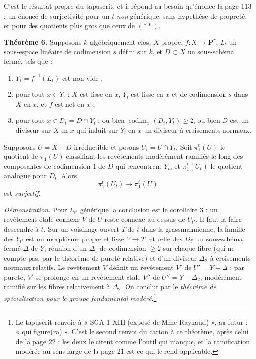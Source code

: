 \documentclass[11pt,a4paper]{article}
\begin{document}
C'est le résultat propre du tapuscrit, et il répond au besoin qu'énonce la page
113 : un énoncé de surjectivité pour un $t$ \emph{non} générique, sans
hypothèse de propreté, et pour des quotients plus gros que ceux de
$(\ast\ast)$.

\textbf{Théorème 6.} Supposons $k$ algébriquement clos, $X$ propre,
$f : X \to \mathbf{P}^{r}$, $L_{t}$ un sous-espace linéaire de codimension $s$
défini sur $k$, et $D \subset X$ un sous-schéma fermé, tels que :

\begin{enumerate}
  \item[a)] $Y_{t} = f^{-1}(L_{t})$ est non vide ;
  \item[b)] pour tout $x \in Y_{t}$ : $X$ est lisse en $x$, $Y_{t}$ est lisse
    en $x$ et de codimension $s$ dans $X$ en $x$, et $f$ est net en $x$ ;
  \item[c)] pour tout $x \in D_{t} = D \cap Y_{t}$ : ou bien
    $\operatorname{codim}_{x}(D_{t}, Y_{t}) \geqslant 2$, ou bien $D$ est un
    diviseur sur $X$ en $x$ qui induit sur $Y_{t}$ en $x$ un diviseur à
    croisements normaux.
\end{enumerate}

Supposons $U = X - D$ irréductible et posons $U_{t} = U \cap Y_{t}$. Soit
$\pi^{t}_{1}(U)$ le quotient de $\pi_{1}(U)$ classifiant les revêtements
modérément ramifiés le long des composantes de codimension 1 de $D$ qui
rencontrent $Y_{t}$, et $\pi^{t}_{1}(U_{t})$ le quotient analogue pour
$D_{t}$. Alors
\[
  \pi^{t}_{1}(U_{t}) \longrightarrow \pi^{t}_{1}(U)
\]
est \emph{surjectif}.

\emph{Démonstration.} Pour $L_{t'}$ générique la conclusion est le corollaire
3 : un revêtement étale connexe $V$ de $U$ reste connexe au-dessus de
$U_{t'}$. Il faut la faire descendre à $t$. Sur un voisinage ouvert $T$ de
$\bar{t}$ dans la grassmannienne, la famille des $Y_{t'}$ est un morphisme
propre et lisse $Y \to T$, et celle des $D_{t'}$ un sous-schéma fermé $\Delta$
de $Y$, réunion d'un $\Delta_{1}$ de codimension $\geqslant 2$ sur chaque
fibre (qui ne compte pas, par le théorème de pureté relative) et d'un
diviseur $\Delta_{2}$ à croisements normaux relatifs. Le revêtement $V$
définit un revêtement $V'$ de $U' = Y - \Delta$ ; par pureté, $V'$ se prolonge
en un revêtement étale $V''$ de $U'' = Y - \Delta_{2}$, modérément ramifié sur
les fibres relativement à $\Delta_{2}$. On conclut par le \emph{théorème de
spécialisation pour le groupe fondamental modéré}.\footnote{Le tapuscrit
renvoie à « SGA 1 XIII (exposé de Mme Raynaud) », au futur : « qui
figure(ra) ». C'est le second renvoi du carton à ce théorème, après celui de la
page 22 ; les deux le citent comme l'outil qui manque, et la ramification
modérée au sens large de la page 21 est ce qui le rend applicable.}
\end{document}
